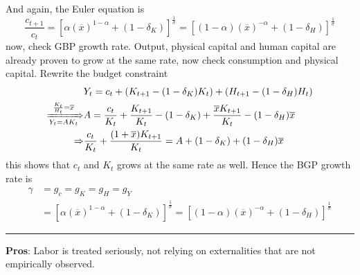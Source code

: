 \documentclass[10pt,landscape,a4paper]{article}
\let\bar\overline
\begin{document}
\begin{multicols*}{3}

And again, the Euler equation is 
$$
\frac{c_{t+1}}{c_t} = \left[\alpha \left(\bar{x}\right)^{1-\alpha}+ (1-\delta_K)\right]^{\frac{1}{\sigma}} = \left[(1-\alpha) \left(\bar{x}\right)^{-\alpha}+ (1-\delta_H)\right]^{\frac{1}{\sigma}}
$$
now, check GBP growth rate. Output, physical capital and human capital are already proven to grow at the same rate, now check consumption and physical capital. Rewrite the budget constraint
\begin{align*}
    & Y_t = c_t + \left(K_{t+1}-(1-\delta_K)K_t\right) + \left(H_{t+1}-(1-\delta_H)H_t\right)\\
    \xRightarrow[Y_t=AK_t]{\frac{K_t}{H_t}=\bar{x}} & A=\frac{c_t}{K_t}+\frac{K_{t+1}}{K_t}-(1-\delta_K) + \frac{\bar{x}K_{t+1}}{K_t}-(1-\delta_H)\bar{x}\\
    \Rightarrow & \frac{c_t}{K_t} + \frac{(1+\bar{x})K_{t+1}}{K_t} = A+ (1-\delta_K)+(1-\delta_H)\bar{x}
\end{align*}
this shows that $c_t$ and $K_t$ grows at the same rate as well. Hence the BGP growth rate is
\begin{align*}
    \gamma &= g_c =g_K=g_H=g_Y\\
    & =\left[\alpha \left(\bar{x}\right)^{1-\alpha}+ (1-\delta_K)\right]^{\frac{1}{\sigma}} = \left[(1-\alpha) \left(\bar{x}\right)^{-\alpha}+ (1-\delta_H)\right]^{\frac{1}{\sigma}}
\end{align*}

\rule{0.325\textwidth}{0.4pt}

\vspace{2pt}

\textbf{Pros}: Labor is treated seriously, not relying on externalities that are not empirically observed.


\end{multicols*}
\end{document}
